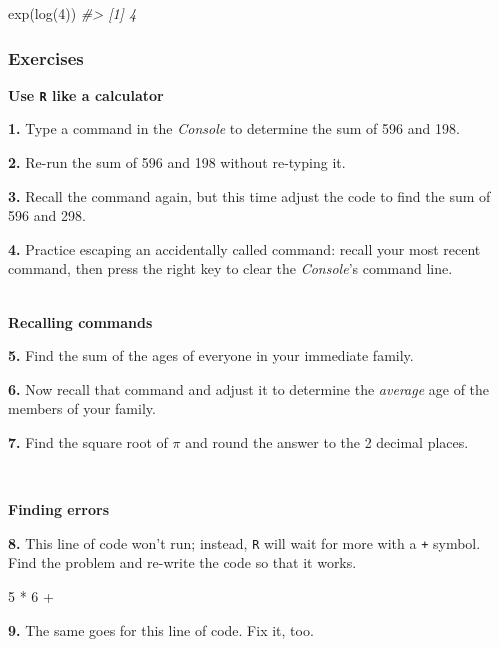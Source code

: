 \documentclass[
]{book}
\newenvironment{Shaded}{\begin{snugshade}}{\end{snugshade}}
\newcommand{\CommentTok}[1]{\textcolor[rgb]{0.56,0.35,0.01}{\textit{#1}}}
\newcommand{\DecValTok}[1]{\textcolor[rgb]{0.00,0.00,0.81}{#1}}
\newcommand{\FunctionTok}[1]{\textcolor[rgb]{0.00,0.00,0.00}{#1}}
\newcommand{\NormalTok}[1]{#1}
\newcommand{\SpecialCharTok}[1]{\textcolor[rgb]{0.00,0.00,0.00}{#1}}
\begin{document}
\begin{Shaded}
\begin{Highlighting}[]
\FunctionTok{exp}\NormalTok{(}\FunctionTok{log}\NormalTok{(}\DecValTok{4}\NormalTok{))}
\CommentTok{\#\textgreater{} [1] 4}
\end{Highlighting}
\end{Shaded}

\hypertarget{exercises}{%
\subsubsection*{Exercises}\label{exercises}}

\textbf{Use \texttt{R} like a calculator}

\textbf{1.} Type a command in the \emph{Console} to determine the sum of 596 and 198.

\textbf{2.} Re-run the sum of 596 and 198 without re-typing it.

\textbf{3.} Recall the command again, but this time adjust the code to find the sum of 596 and 298.

\textbf{4.} Practice escaping an accidentally called command: recall your most recent command, then press the right key to clear the \emph{Console}'s command line.

~\\
\textbf{Recalling commands}

\textbf{5.} Find the sum of the ages of everyone in your immediate family.

\textbf{6.} Now recall that command and adjust it to determine the \emph{average} age of the members of your family.

\textbf{7.} Find the square root of \(\pi\) and round the answer to the 2 decimal places.

~

\textbf{Finding errors}

\textbf{8.} This line of code won't run; instead, \texttt{R} will wait for more with a \texttt{+} symbol. Find the problem and re-write the code so that it works.

\begin{Shaded}
\begin{Highlighting}[]
\DecValTok{5} \SpecialCharTok{*} \DecValTok{6} \SpecialCharTok{+}
\end{Highlighting}
\end{Shaded}

\textbf{9.} The same goes for this line of code. Fix it, too.
\end{document}
